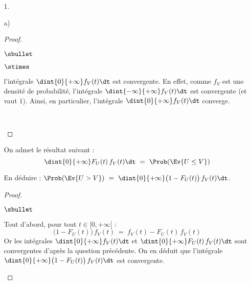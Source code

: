 \documentclass[11pt]{article}%
\begin{document}
\begin{noliste}{1.}
\begin{noliste}{a)}
\begin{proof}
\begin{noliste}{$\sbullet$}
\begin{noliste}{$\stimes$}
        \item l'intégrale $\dint{0}{+\infty} f_V(t) \dt$ est
          convergente. En effet, comme $f_V$ est une densité de
          probabilité, l'intégrale $\dint{-\infty}{+\infty} f_V(t)
          \dt$ est convergente (et vaut $1$). Ainsi, en
          particulier, l'intégrale $\dint{0}{+\infty} f_V(t) \dt$ converge.
        \end{noliste}
        ~\\[-1.4cm]
      \end{noliste}
    \end{proof}
  \end{noliste}


  \newpage


  \noindent %
  On admet le résultat suivant :
  \[
    \dint{0}{+\infty} F_U(t) \, f_V(t) \dt \ = \ \Prob(\Ev{U \leq V})
  \]
  
\item En déduire : $\Prob(\Ev{U > V}) \ = \ \dint{0}{+\infty} \big(1 -
  F_U(t)\big) \, f_V(t) \dt$.
  \begin{proof}~
    \begin{noliste}{$\sbullet$}
    \item Tout d'abord, pour tout $t \in [0,+\infty[$ :
      \[
        \big(1- F_U(t)\big) \, f_V(t) \ = \ f_V(t) - F_U(t) \, f_V(t)
      \]
      Or les intégrales $\dint{0}{+\infty} f_V(t) \dt$ et
      $\dint{0}{+\infty} F_U(t) \, f_V(t) \dt$ sont convergentes
      d'après la question précédente.
      On en déduit que l'intégrale $\dint{0}{+\infty} \big(1-
      F_U(t)\big) \, f_V(t) \dt$ est convergente.
      

\end{noliste}
\end{proof}
\end{noliste}
\end{document}
